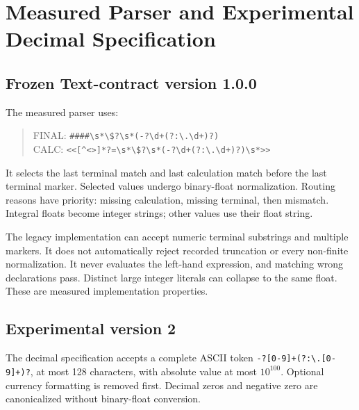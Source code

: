 \documentclass[journal,onecolumn]{IEEEtran}
\begin{document}
\section{Measured Parser and Experimental Decimal Specification}
\label{sec:s2}
\subsection{Frozen Text-contract version 1.0.0}
The measured parser uses:
\begin{quote}\ttfamily\scriptsize
FINAL: \verb|####\s*\$?\s*(-?\d+(?:\.\d+)?)|\\
CALC: \verb|<<[^<>]*?=\s*\$?\s*(-?\d+(?:\.\d+)?)\s*>>|
\end{quote}
It selects the last terminal match and last calculation match before the last terminal marker. Selected values undergo binary-float normalization. Routing reasons have priority: missing calculation, missing terminal, then mismatch. Integral floats become integer strings; other values use their float string.

The legacy implementation can accept numeric terminal substrings and multiple markers. It does not automatically reject recorded truncation or every non-finite normalization. It never evaluates the left-hand expression, and matching wrong declarations pass. Distinct large integer literals can collapse to the same float. These are measured implementation properties.

\subsection{Experimental version 2}
The decimal specification accepts a complete ASCII token \verb|-?[0-9]+(?:\.[0-9]+)?|, at most 128 characters, with absolute value at most $10^{100}$. Optional currency formatting is removed first. Decimal zeros and negative zero are canonicalized without binary-float conversion.
\end{document}
